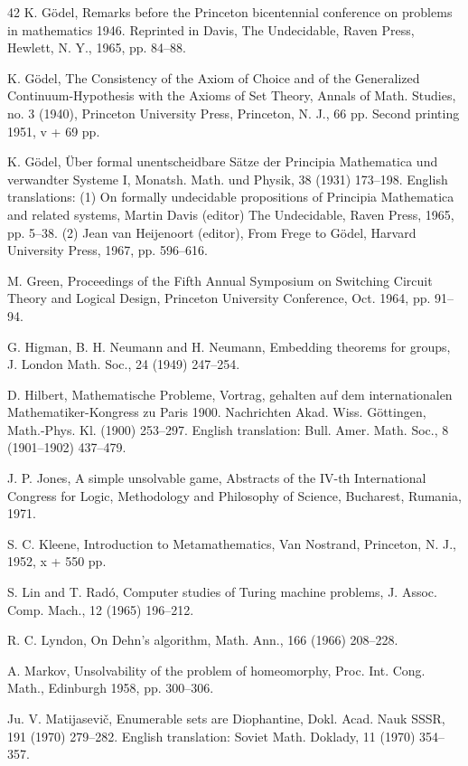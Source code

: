 \documentclass[11pt]{article}
\newcommand{\origpage}[1]{\marginnote{\footnotesize\textbf{[#1]}}}
\begin{document}
\begin{thebibliography}{42}
 K. Gödel, Remarks before the Princeton bicentennial conference on problems in mathematics 1946. Reprinted in Davis, The Undecidable, Raven Press, Hewlett, N. Y., 1965, pp. 84--88.

 K. Gödel, The Consistency of the Axiom of Choice and of the Generalized Continuum-Hypothesis with the Axioms of Set Theory, Annals of Math. Studies, no. 3 (1940), Princeton University Press, Princeton, N. J., 66 pp. Second printing 1951, v + 69 pp.

 K. Gödel, Über formal unentscheidbare Sätze der Principia Mathematica und verwandter Systeme I, Monatsh. Math. und Physik, 38 (1931) 173--198. English translations: (1) On formally undecidable propositions of Principia Mathematica and related systems, Martin Davis (editor) The Undecidable, Raven Press, 1965, pp. 5--38. (2) Jean van Heijenoort (editor), From Frege to Gödel, Harvard University Press, 1967, pp. 596--616.

 M. Green, Proceedings of the Fifth Annual Symposium on Switching Circuit Theory and Logical Design, Princeton University Conference, Oct. 1964, pp. 91--94.

 G. Higman, B. H. Neumann and H. Neumann, Embedding theorems for groups, J. London Math. Soc., 24 (1949) 247--254.

 D. Hilbert, Mathematische Probleme, Vortrag, gehalten auf dem internationalen Mathematiker-Kongress zu Paris 1900. Nachrichten Akad. Wiss. Göttingen, Math.-Phys. Kl. (1900) 253--297. English translation: Bull. Amer. Math. Soc., 8 (1901--1902) 437--479.

 J. P. Jones, A simple unsolvable game, Abstracts of the IV-th International Congress for Logic, Methodology and Philosophy of Science, Bucharest, Rumania, 1971.

 S. C. Kleene, Introduction to Metamathematics, Van Nostrand, Princeton, N. J., 1952, x + 550 pp.

 \origpage{738}S. Lin and T. Radó, Computer studies of Turing machine problems, J. Assoc. Comp. Mach., 12 (1965) 196--212.

 R. C. Lyndon, On Dehn's algorithm, Math. Ann., 166 (1966) 208--228.

 A. Markov, Unsolvability of the problem of homeomorphy, Proc. Int. Cong. Math., Edinburgh 1958, pp. 300--306.

 Ju. V. Matijasevič, Enumerable sets are Diophantine, Dokl. Acad. Nauk SSSR, 191 (1970) 279--282. English translation: Soviet Math. Doklady, 11 (1970) 354--357.


\end{thebibliography}
\end{document}
